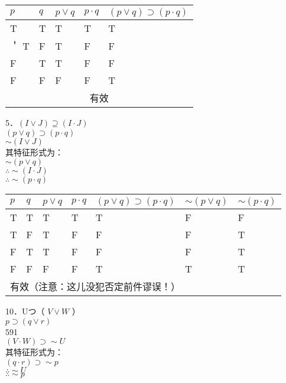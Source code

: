 \begin{center}
\begin{tabular}{|l|l|l|l|l|}
\hline
$p$ & $q$ & $p \vee q$ & $p \cdot q$ & $(p \vee q) \supset(p \cdot q)$ \\
\hline
T & T & T & T & T \\
\hline
＇ T & F & T & F & F \\
\hline
F & T & T & F & F \\
\hline
F & F & F & F & T \\
\hline
\multicolumn{5}{|c|}{有效} \\
\hline
\end{tabular}
\end{center}

5．$(I \vee J) \supseteq(I \cdot J)$\\
$(p \vee q) \supset(p \cdot q)$\\
$\sim(I \vee J)$\\
其特征形式为：\\
$\sim(p \vee q)$\\
$\therefore \sim(I \cdot J)$\\
$\therefore \sim(p \cdot q)$

\begin{center}
\begin{tabular}{|l|l|l|l|l|l|l|}
\hline
$p$ & $q$ & $p \vee q$ & $p \cdot q$ & $(p \vee q) \supset(p \cdot q)$ & $\sim(p \vee q)$ & $\sim(p \cdot q)$ \\
\hline
T & T & T & T & T & F & F \\
\hline
T & F & T & F & F & F & T \\
\hline
F & T & T & F & F & F & T \\
\hline
F & F & F & F & T & T & T \\
\hline
\multicolumn{7}{|l|}{有效（注意：这儿没犯否定前件谬误！）} \\
\hline
\end{tabular}
\end{center}

10．Uつ（ $V \vee W$ ）\\
$p \supset(q \vee r)$\\
591\\
$(V \cdot W) \supset \sim U$\\
其特征形式为：\\
$(q \cdot r) \supset \sim p$\\
$\therefore \sim U$\\
$\therefore \sim p$


